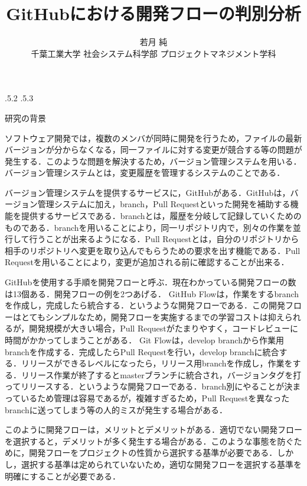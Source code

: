 \documentclass[uplatex,twocolumn]{jsarticle}
\title{\vspace{-14mm}GitHubにおける開発フローの判別分析 \footnotemark[0]}
\author{若月 純 \footnotemark[2] \\ 千葉工業大学 社会システム科学部 プロジェクトマネジメント学科\footnotemark[2]}
\date{}%
\makeatletter
\renewcommand{\section}{%
    \if@slide\clearpage\fi
    \@startsection{section}{1}{\z@}%
    {\Cvs \@plus.5\Cdp \@minus.2\Cdp}%
    {.5\Cvs \@plus.3\Cdp}%
    {\normalfont\raggedright}}
\makeatother
\begin{document}
\twocolumn[
	\maketitle
]
\begingroup
\def\thefootnote{\fnsymbol{footnote}}
\endgroup

\section{研究の背景}

ソフトウェア開発では，複数のメンバが同時に開発を行うため，ファイルの最新バージョンが分からなくなる，同一ファイルに対する変更が競合する等の問題が発生する．このような問題を解決するため，バージョン管理システムを用いる．バージョン管理システムとは，変更履歴を管理するシステムのことである\cite{ikeda2014}．

バージョン管理システムを提供するサービスに，GitHubがある．GitHubは，バージョン管理システムに加え，branch，Pull Requestといった開発を補助する機能を提供するサービスである．branchとは，履歴を分岐して記録していくためのものである．branchを用いることにより，同一リポジトリ内で，別々の作業を並行して行うことが出来るようになる．Pull Requestとは，自分のリポジトリから相手のリポジトリへ変更を取り込んでもらうための要求を出す機能である．Pull Requestを用いることにより，変更が追加される前に確認することが出来る．

GitHubを使用する手順を開発フローと呼ぶ．現在わかっている開発フローの数は13個ある．開発フローの例を2つあげる．
GitHub Flowは，作業をするbranchを作成し，完成したら統合する．というような開発フローである．この開発フローはとてもシンプルなため，開発フローを実施するまでの学習コストは抑えられるが，開発規模が大きい場合，Pull Requestがたまりやすく，コードレビューに時間がかかってしまうことがある．
Git Flowは，develop branchから作業用branchを作成する．完成したらPull Requestを行い，develop branchに統合する．リリースができるレベルになったら，リリース用branchを作成し，作業をする．リリース作業が終了するとmasterブランチに統合され，バージョンタグを打ってリリースする．というような開発フローである．branch別にやることが決まっているため管理は容易であるが，複雑すぎるため，Pull Requestを異なったbranchに送ってしまう等の人的ミスが発生する場合がある\cite{otsuka2014}．

このように開発フローは，メリットとデメリットがある．適切でない開発フローを選択すると，デメリットが多く発生する場合がある．このような事態を防ぐために，開発フローをプロジェクトの性質から選択する基準が必要である．しかし，選択する基準は定められていないため，適切な開発フローを選択する基準を明確にすることが必要である．
\end{document}
